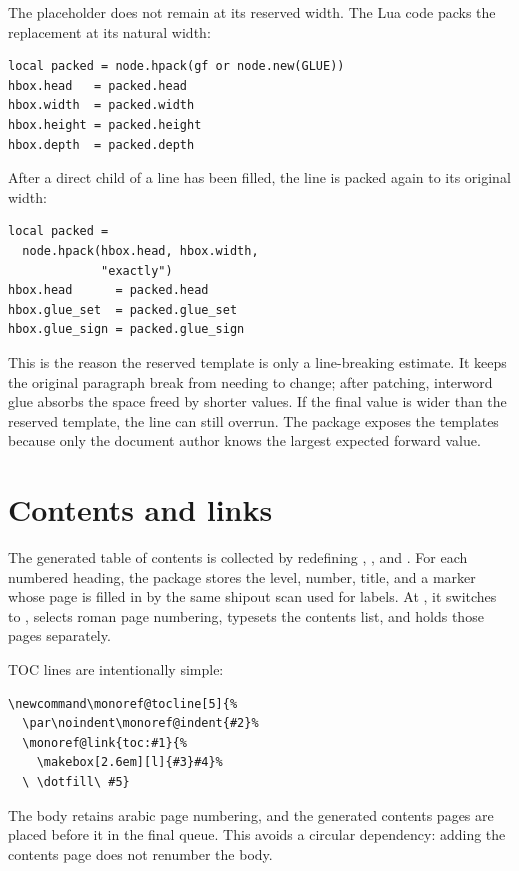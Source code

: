 \documentclass{ltugboat}
\begin{document}
The placeholder does not remain at its reserved width.  The Lua code
packs the replacement at its natural width:
\begin{lstlisting}[style=monoreflua]
local packed = node.hpack(gf or node.new(GLUE))
hbox.head   = packed.head
hbox.width  = packed.width
hbox.height = packed.height
hbox.depth  = packed.depth
\end{lstlisting}
After a direct child of a line has been filled, the line is packed again
to its original width:
\begin{lstlisting}[style=monoreflua]
local packed =
  node.hpack(hbox.head, hbox.width,
             "exactly")
hbox.head      = packed.head
hbox.glue_set  = packed.glue_set
hbox.glue_sign = packed.glue_sign
\end{lstlisting}
This is the reason the reserved template is only a line-breaking
estimate.  It keeps the original paragraph break from needing to change;
after patching, interword glue absorbs the space freed by shorter
values.  If the final value is wider than the reserved template, the
line can still overrun.  The package exposes the templates because only
the document author knows the largest expected forward value.

\section{Contents and links}

The generated table of contents is collected by redefining
, , and .  For each
numbered heading, the package stores the level, number, title, and a
marker whose page is filled in by the same shipout scan used for
labels.  At , it switches
 to , selects roman page numbering,
typesets the contents list, and holds those pages separately.

TOC lines are intentionally simple:
\begin{lstlisting}[style=monoreftex]
\newcommand\monoref@tocline[5]{%
  \par\noindent\monoref@indent{#2}%
  \monoref@link{toc:#1}{%
    \makebox[2.6em][l]{#3}#4}%
  \ \dotfill\ #5}
\end{lstlisting}
The body retains arabic page numbering, and the generated contents
pages are placed before it in the final queue.  This avoids a circular
dependency: adding the contents page does not renumber the body.
\end{document}
